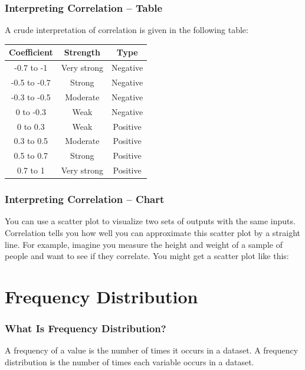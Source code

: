 \documentclass[aspectratio=169,11pt,svgnames]{beamer}
\begin{document}
\begin{frame}
 \frametitle{Interpreting Correlation -- Table}
 A crude interpretation of correlation is given in the following table:
 \begin{center}
  \begin{tabular}{ccc}
   \textbf{Coefficient} & \textbf{Strength} & \textbf{Type} \\
   \toprule
   -0.7 to -1 & Very strong & Negative\\
   -0.5 to -0.7 & Strong & Negative\\
   -0.3 to -0.5 & Moderate & Negative\\
   0 to -0.3 & Weak & Negative\\
   0 to 0.3 & Weak & Positive\\
   0.3 to 0.5 & Moderate & Positive\\
   0.5 to 0.7 & Strong & Positive\\
   0.7 to 1 & Very strong & Positive
  \end{tabular}
 \end{center}
\end{frame}

\begin{frame}
 \frametitle{Interpreting Correlation -- Chart}
 You can use a scatter plot to visualize two sets of outputs with the same
 inputs.
 \pause
 Correlation tells you \alert{how well you can approximate} this scatter plot by
 a straight line.
 \pause
 For example, imagine you measure the height and weight of a sample of people
 and want to see if they correlate. You might get a scatter plot like this:
 \pause
 \begin{center}
 \end{center}
\end{frame}

\section{Frequency Distribution}

\begin{frame}
 \frametitle{What Is Frequency Distribution?}
 \begin{tcolorbox}[title=Frequency Distribution]
  A \alert{frequency} of a value is the number of times it occurs in a dataset.
  A \alert{frequency distribution} is the number of times each variable occurs
  in a dataset.
 \end{tcolorbox}
\end{frame}
\end{document}
